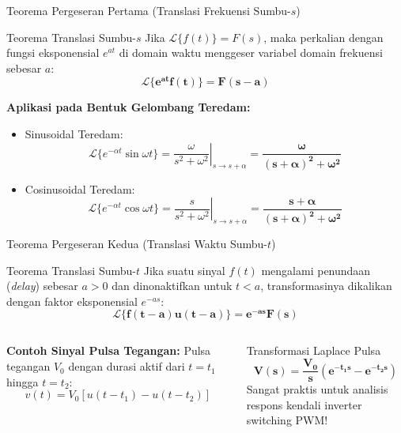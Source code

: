 \documentclass[aspectratio=169,10pt]{beamer}
\begin{document}
\begin{frame}{Teorema Pergeseran Pertama (Translasi Frekuensi Sumbu-$s$)}
  \begin{block}{Teorema Translasi Sumbu-$s$}
    Jika $\mathcal{L}\{f(t)\} = F(s)$, maka perkalian dengan fungsi eksponensial $e^{at}$ di domain waktu menggeser variabel domain frekuensi sebesar $a$:
    \begin{equation}
      \mathbf{\mathcal{L}\{e^{at} f(t)\} = F(s - a)}
    \end{equation}
  \end{block}
  \vspace{0.15cm}
  \textbf{Aplikasi pada Bentuk Gelombang Teredam:}
  \begin{itemize}
    \item Sinusoidal Teredam:
    \begin{equation*}
      \mathcal{L}\{e^{-\alpha t} \sin\omega t\} = \left. \frac{\omega}{s^2 + \omega^2} \right|_{s \to s + \alpha} = \mathbf{\frac{\omega}{(s + \alpha)^2 + \omega^2}}
    \end{equation*}
    \item Cosinusoidal Teredam:
    \begin{equation*}
      \mathcal{L}\{e^{-\alpha t} \cos\omega t\} = \left. \frac{s}{s^2 + \omega^2} \right|_{s \to s + \alpha} = \mathbf{\frac{s + \alpha}{(s + \alpha)^2 + \omega^2}}
    \end{equation*}
  \end{itemize}
\end{frame}

\begin{frame}{Teorema Pergeseran Kedua (Translasi Waktu Sumbu-$t$)}
  \begin{block}{Teorema Translasi Sumbu-$t$}
    Jika suatu sinyal $f(t)$ mengalami penundaan (\textit{delay}) sebesar $a > 0$ dan dinonaktifkan untuk $t < a$, transformasinya dikalikan dengan faktor eksponensial $e^{-as}$:
    \begin{equation}
      \mathbf{\mathcal{L}\{f(t - a) u(t - a)\} = e^{-as} F(s)}
    \end{equation}
  \end{block}
  \vspace{0.15cm}
  \begin{columns}[t]
    \textbf{Contoh Sinyal Pulsa Tegangan:}
    Pulsa tegangan $V_0$ dengan durasi aktif dari $t = t_1$ hingga $t = t_2$:
    \begin{equation*}
      v(t) = V_0 [u(t - t_1) - u(t - t_2)]
    \end{equation*}

    \begin{exampleblock}{Transformasi Laplace Pulsa}
      \begin{equation*}
        \mathbf{V(s) = \frac{V_0}{s} \left( e^{-t_1 s} - e^{-t_2 s} \right)}
      \end{equation*}
      Sangat praktis untuk analisis respons kendali inverter switching PWM!
    \end{exampleblock}
  \end{columns}
\end{frame}
\end{document}
